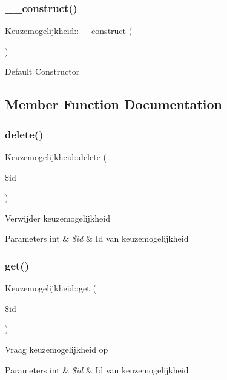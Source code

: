 \subsubsection{\texorpdfstring{\+\_\+\+\_\+construct()}{\_\_construct()}}
{\footnotesize\ttfamily Keuzemogelijkheid\+::\+\_\+\+\_\+construct (\begin{DoxyParamCaption}{ }\end{DoxyParamCaption})}

Default Constructor

\subsection{Member Function Documentation}
\mbox{\label{class_keuzemogelijkheid_a569638d382493486135eeea9b7d1cca5}} 
\subsubsection{\texorpdfstring{delete()}{delete()}}
{\footnotesize\ttfamily Keuzemogelijkheid\+::delete (\begin{DoxyParamCaption}\item[{}]{\$id }\end{DoxyParamCaption})}

Verwijder keuzemogelijkheid 
\begin{DoxyParams}[1]{Parameters}
int & {\em \$id} & Id van keuzemogelijkheid \\
\hline
\end{DoxyParams}
\mbox{\label{class_keuzemogelijkheid_a507c36e7d7fd35a2a080524fce31ec4d}} 
\subsubsection{\texorpdfstring{get()}{get()}}
{\footnotesize\ttfamily Keuzemogelijkheid\+::get (\begin{DoxyParamCaption}\item[{}]{\$id }\end{DoxyParamCaption})}

Vraag keuzemogelijkheid op 
\begin{DoxyParams}[1]{Parameters}
int & {\em \$id} & Id van keuzemogelijkheid \\
\hline
\end{DoxyParams}
\mbox{\label{class_keuzemogelijkheid_ae621c2f2cc768da82291345a301f746a}} 
